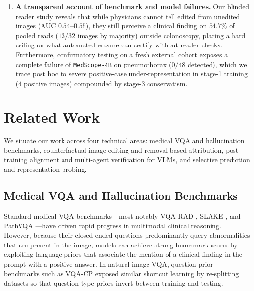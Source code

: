 \documentclass{article} %
\begin{document}
\begin{enumerate}[leftmargin=*,nosep]
    \item \textbf{A transparent account of benchmark and model failures.} Our blinded reader study reveals that while physicians cannot tell edited from unedited images ($\text{AUC } 0.54\text{--}0.55$), they still perceive a clinical finding on $54.7\%$ of pooled reads ($13/32$ images by majority) outside colonoscopy, placing a hard ceiling on what automated erasure can certify without reader checks. Furthermore, confirmatory testing on a fresh external cohort exposes a complete failure of \texttt{MedScope-4B} on pneumothorax ($0/48$ detected), which we trace post hoc to severe positive-case under-representation in stage-1 training ($4$ positive images) compounded by stage-3 conservatism.
\end{enumerate}

\section{Related Work}
\label{sec:related_work}
We situate our work across four technical areas: medical VQA and hallucination benchmarks, counterfactual image editing and removal-based attribution, post-training alignment and multi-agent verification for VLMs, and selective prediction and representation probing.

\subsection{Medical VQA and Hallucination Benchmarks}
\label{subsec:rw_benchmarks}
Standard medical VQA benchmarks---most notably VQA-RAD \citep{lau2018vqarad}, SLAKE \citep{liu2021slake}, and PathVQA \citep{he2020pathvqa}---have driven rapid progress in multimodal clinical reasoning. However, because their closed-ended questions predominantly query abnormalities that are present in the image, models can achieve strong benchmark scores by exploiting language priors that associate the mention of a clinical finding in the prompt with a positive answer. In natural-image VQA, question-prior benchmarks such as VQA-CP \citep{agrawal2018vqacp} exposed similar shortcut learning by re-splitting datasets so that question-type priors invert between training and testing.
\end{document}
